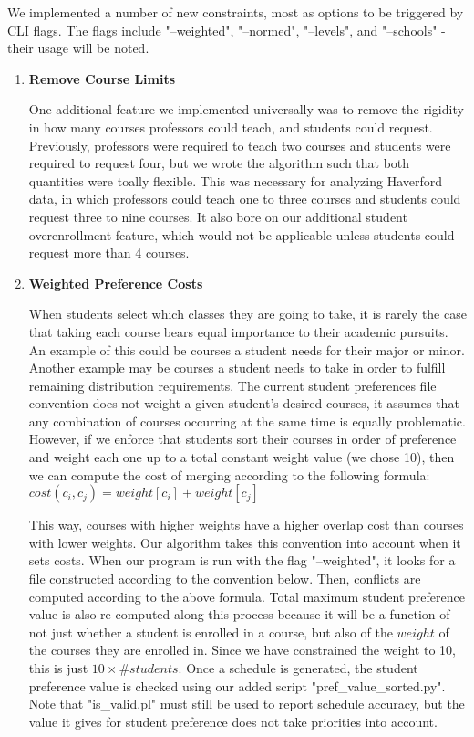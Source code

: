 \documentclass[11pt, oneside]{article}   	%
\begin{document}
We implemented a number of new constraints, most as options to be triggered by CLI flags. The flags include "--weighted", "--normed", "--levels", and "--schools" - their usage will be noted.

\begin{enumerate}
\item{\textbf{Remove Course Limits}}

One additional feature we implemented universally was to remove the rigidity in how many courses professors could teach, and students could request. Previously, professors were required to teach two courses and students were required to request four, but we wrote the algorithm such that both quantities were toally flexible. This was necessary for analyzing Haverford data, in which professors could teach one to three courses and students could request three to nine courses. It also bore on our additional student overenrollment feature, which would not be applicable unless students could request more than 4 courses.

\item{\textbf{Weighted Preference Costs}}

When students select which classes they are going to take, it is rarely the case that taking each course bears equal importance to their academic pursuits. An example of this could be courses a student needs for their major or minor. Another example may be courses a student needs to take in order to fulfill remaining distribution requirements. The current student preferences file convention does not weight a given student's desired courses, it assumes that any combination of courses occurring at the same time is equally problematic. However, if we enforce that students sort their courses in order of preference and weight each one up to a total constant weight value (we chose 10), then we can compute the cost of merging according to the following formula:\\

$cost(c_i,c_j) = weight[c_i] + weight[c_j]$

This way, courses with higher weights have a higher overlap cost than courses with lower weights. Our algorithm takes this convention into account when it sets costs. When our program is run with the flag "--weighted", it looks for a file constructed according to the convention below. Then, conflicts are computed according to the above formula. Total maximum student preference value is also re-computed along this process because it will be a function of not just whether a student is enrolled in a course, but also of the $weight$ of the courses they are enrolled in. Since we have constrained the weight to 10, this is just $10\times \#students$. Once a schedule is generated, the student preference value is checked using our added script "pref\_value\_sorted.py". Note that "is\_valid.pl" must still be used to report schedule accuracy, but the value it gives for student preference does not take priorities into account.\\


\end{enumerate}
\end{document}
